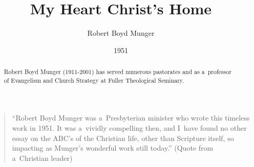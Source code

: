 \documentclass[a4paper,12pt]{article}
\begin{document}
	
\title{My Heart Christ's Home}
\author{Robert Boyd Munger}
\date{1951}
\maketitle

\begin{abstract}
    Robert Boyd Munger (1911-2001) has served numerous pastorates and as a~professor of Evangelism and Church Strategy at Fuller Theological Seminary.
\end{abstract}

    \begin{quote}
    “Robert Boyd Munger was a~Presbyterian minister who wrote this timeless work in 1951. It was a~vividly compelling then, and I~have found no other essay on the ABC's of the Christian life, other than Scripture itself, so impacting as Munger's wonderful work still today.” 
    (Quote from a~Christian leader)
    \end{quote}

\vspace{1cm}
\end{document}
